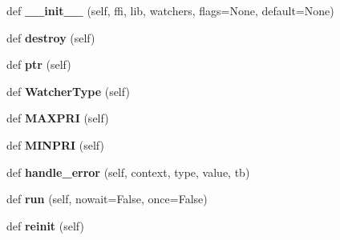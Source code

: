 \begin{DoxyCompactItemize}
\item 
\mbox{\label{classgevent_1_1__ffi_1_1loop_1_1_abstract_loop_acd873d2d297bcc9d5b79909d936960df}} 
def {\bfseries \+\_\+\+\_\+init\+\_\+\+\_\+} (self, ffi, lib, watchers, flags=None, default=None)
\item 
\mbox{\label{classgevent_1_1__ffi_1_1loop_1_1_abstract_loop_a3e5ef644a9adeee3075256a5f9969403}} 
def {\bfseries destroy} (self)
\item 
\mbox{\label{classgevent_1_1__ffi_1_1loop_1_1_abstract_loop_a79b80e2f9e8461485ffe7f9b172ec86b}} 
def {\bfseries ptr} (self)
\item 
\mbox{\label{classgevent_1_1__ffi_1_1loop_1_1_abstract_loop_a99b530391c222692d3c732d099cc1104}} 
def {\bfseries Watcher\+Type} (self)
\item 
\mbox{\label{classgevent_1_1__ffi_1_1loop_1_1_abstract_loop_a66ecc332144064d2d7e589166bafdd98}} 
def {\bfseries M\+A\+X\+P\+RI} (self)
\item 
\mbox{\label{classgevent_1_1__ffi_1_1loop_1_1_abstract_loop_a0119b438004e9b7b07c1f173146c4b19}} 
def {\bfseries M\+I\+N\+P\+RI} (self)
\item 
\mbox{\label{classgevent_1_1__ffi_1_1loop_1_1_abstract_loop_a76e0b8aa3e8674a0a1b9b0ed67dd7e06}} 
def {\bfseries handle\+\_\+error} (self, context, type, value, tb)
\item 
\mbox{\label{classgevent_1_1__ffi_1_1loop_1_1_abstract_loop_a3ed90749368bcee37dcdceb159d15f76}} 
def {\bfseries run} (self, nowait=False, once=False)
\item 
\mbox{\label{classgevent_1_1__ffi_1_1loop_1_1_abstract_loop_ae7d4222ab4c433113995b3c0dd42aa19}} 
def {\bfseries reinit} (self)

\end{DoxyCompactItemize}
